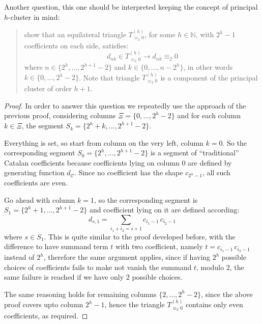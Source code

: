 \documentclass[11pt,a4paper]{article} %
\begin{document}
    Another question, this one should be interpreted keeping the
    concept of principal $h$-cluster in mind:
    \begin{quote}
        show that an equilateral triangle $T_{\equiv_{2} 0}^{(h)}$, 
        for some $h\in\mathbb{N}$,
        with $2^{h}-1$ coefficients on each side, satisfies:
        \begin{displaymath}
            d_{nk} \in T_{\equiv_{2} 0}^{(h)} \rightarrow d_{nk} \equiv_{2} 0
        \end{displaymath}
        where $n\in\lbrace 2^{h},\ldots,2^{h+1}-2\rbrace$ and 
        $k\in\lbrace 0,\ldots, n-2^{h}\rbrace$, in other words
        $k\in\lbrace 0,\ldots, 2^{h}-2\rbrace$. Note that triangle
        $T_{\equiv_{2} 0}^{(h)}$ is a component of the principal cluster
        of order $h+1$.
    \end{quote}
    \begin{proof}
    In order to answer this question we repeatedly use the approach
    of the previous proof, considering columns $\Xi=\lbrace 0,\ldots, 2^{h}-2\rbrace$ and
    for each column $k\in\Xi$, the segment $S_{k}=\lbrace2^{h}+k,\ldots,2^{h+1}-2 \rbrace$.

    Everything is set, so start from column on the very left, column $k=0$.
    So the corresponding segment $S_{0}=\lbrace2^{h},\ldots,2^{h+1}-2 \rbrace$ is
    a segment of ``traditional'' Catalan coefficients because coefficients lying on
    column $0$ are defined by generating function $d_{\mathcal{C}}$. Since no
    coefficient has the shape $c_{2^{\alpha}-1}$, all such coefficients are even.

    Go ahead with column $k=1$, so the corresponding segment is 
    $S_{1}=\lbrace2^{h}+1,\ldots,2^{h+1}-2 \rbrace$ and coefficient lying on it
    are defined according:
    \begin{displaymath}
        d_{s, 1} = \sum_{i_{1}+i_{2}=s+1} {c_{i_{1}-1}\,c_{i_{2}-1}}
    \end{displaymath}
    where $s\in S_{1}$. This is quite similar to the proof developed before,
    with the difference to have summand term $t$ with two coefficient, namely
    $t=c_{i_{1}-1}\,c_{i_{2}-1}$ instead of $2^{h}$, therefore the same argument applies,
    since if having $2^{h}$ possible choices of coefficients fails to make not vanish
    the summand $t$, modulo $2$, the same failure is reached if we have only $2$ possible choices.

    The same reasoning holds for remaining columns $\lbrace 2,\ldots, 2^{h}-2\rbrace$,
    since the above proof covers upto column $2^{h}-1$, hence the triangle $T_{\equiv_{2} 0}^{(h)}$
    contains only even coefficients, as required.

    \end{proof}
\end{document}
